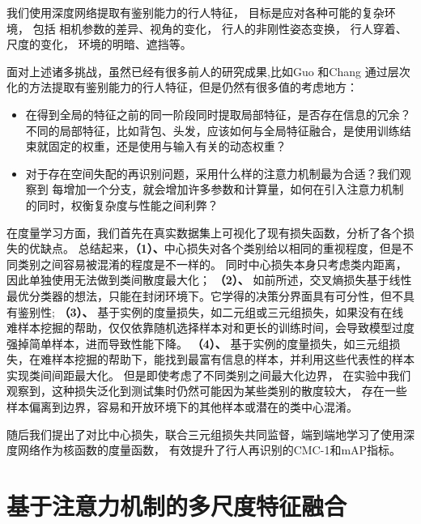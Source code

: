 我们使用深度网络提取有鉴别能力的行人特征，
目标是应对各种可能的复杂环境，
包括
相机参数的差异、视角的变化，
行人的非刚性姿态变换，
行人穿着、尺度的变化，
环境的明暗、遮挡等。

面对上述诸多挑战，虽然已经有很多前人的研究成果,比如Guo \etal\cite{guo2018multilevel}和Chang \etal\cite{chang2018factor}通过层次化的方法提取有鉴别能力的行人特征，但是仍然有很多值的考虑地方：

\begin{itemize}
	\item \cite{zhao2017part} 在得到全局的特征之前的同一阶段同时提取局部特征，是否存在信息的冗余？
	      不同的局部特征，比如背包、头发，应该如何与全局特征融合，是使用训练结束就固定的权重，还是使用与输入有关的动态权重？
	\item 对于存在空间失配的再识别问题，采用什么样的注意力机制最为合适？我们观察到\cite{zhao2017part} 每增加一个分支，就会增加许多参数和计算量，如何在引入注意力机制的同时，权衡复杂度与性能之间利弊？
\end{itemize}

在度量学习方面，我们首先在真实数据集上可视化了现有损失函数，分析了各个损失的优缺点。
总结起来，\textbf{（1）、}中心损失对各个类别给以相同的重视程度，但是不同类别之间容易被混淆的程度是不一样的。
同时中心损失本身只考虑类内距离，因此单独使用无法做到类间散度最大化；
\textbf{（2）、}
如前所述，交叉熵损失基于线性最优分类器的想法，只能在封闭环境下。它学得的决策分界面具有可分性，但不具有鉴别性;
\textbf{（3）、}
基于实例的度量损失，如二元组或三元组损失，如果没有在线难样本挖掘的帮助\cite{yaqing2016semantics}，仅仅依靠随机选择样本对和更长的训练时间，会导致模型过度强掉简单样本，进而导致性能下降。
\textbf{（4）、}
基于实例的度量损失，如三元组损失，在难样本挖掘的帮助下，能找到最富有信息的样本，并利用这些代表性的样本实现类间间距最大化。
但是即使考虑了不同类别之间最大化边界，
在实验中我们观察到，这种损失泛化到测试集时仍然可能因为某些类别的散度较大，
存在一些样本偏离到边界，容易和开放环境下的其他样本或潜在的类中心混淆。

随后我们提出了对比中心损失，联合三元组损失共同监督，端到端地学习了使用深度网络作为核函数的度量函数，
有效提升了行人再识别的CMC-1和mAP指标。

\chapter{基于注意力机制的多尺度特征融合}


